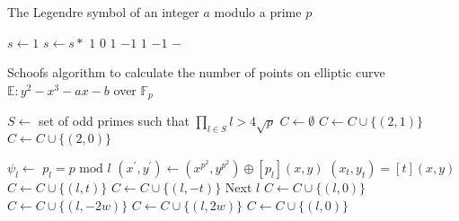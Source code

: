 \begin{algorithm} \label{legendresymbol} 
	\caption{The Legendre symbol of an integer $a$ modulo a prime $p$}
	\begin{algorithmic}[1]
			\State $s \leftarrow 1 $
				\State $s \leftarrow s * $
			\EndFor
			  		\State \Return $1$
			  		\State \Return $0$ 
			  			\State \Return $1$
			  		\Else
			  			\State \Return $-1$
			  		\EndIf
			  			\State \Return $1$
			  		\Else
			  			\State \Return $-1$
			  		\EndIf 
			  		\State \Return {} 
			  		\State \Return {}
			  	\Else
			  		\State \Return $-$
			  	\EndIf
		  	\EndFunction
		  	\State {}
		\EndFunction
	\end{algorithmic} 
\end{algorithm} 

\begin{algorithm} \label{schoof}
	\caption{Schoofs algorithm to calculate the number of points on elliptic curve $\mathbb{E} : y^2 - x^3 - ax - b$ over $\mathbb{F}_p$}
	\begin{algorithmic}[1]
			\State $S \leftarrow $ set of odd primes such that $\prod_{l \in S}l > 4\sqrt{p}$  
			\State $C \leftarrow \emptyset $
				\State $C \leftarrow C \cup \lbrace (2,1) \rbrace $
			\Else 
				\State $C \leftarrow C \cup \lbrace (2,0) \rbrace $
			\EndIf

				\State $\psi_l \leftarrow $  
				\State $p_l = p \text{ mod } l$
				\State $(x^\prime,y^\prime) \leftarrow (x^{p^2},y^{p^2}) \oplus [p_l](x,y) $ 
					\State $(x_{t},y_{t}) = [t](x,y)$
							\State $C \leftarrow C \cup \lbrace (l,t) \rbrace $
						\Else
							\State $C \leftarrow C \cup \lbrace (l,-t) \rbrace $
						\EndIf
						\State Next $l$
					\EndIf
				\EndFor 
						\State $C \leftarrow C \cup \lbrace (l,0) \rbrace $
					\Else
							\State $C \leftarrow C \cup \lbrace (l,-2w) \rbrace $
						\Else
							\State $C \leftarrow C \cup \lbrace (l,2w) \rbrace $
						\EndIf 
					\EndIf
				\Else
					\State $C \leftarrow C \cup \lbrace (l,0) \rbrace $
				\EndIf 
			\EndFor 
			\State {} 
	  	\EndFunction
	\end{algorithmic} 
\end{algorithm} 

